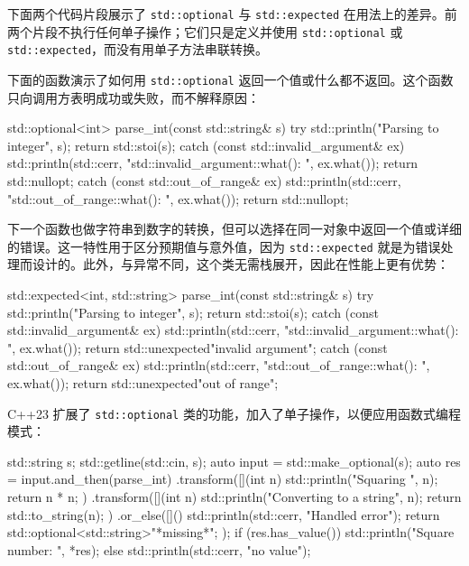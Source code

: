 下面两个代码片段展示了 \texttt{std::\allowbreak{}optional} 与 \texttt{std::\allowbreak{}expected} 在用法上的差异。前两个片段不执行任何单子操作；它们只是定义并使用 \texttt{std::\allowbreak{}optional} 或 \texttt{std::\allowbreak{}expected}，而没有用单子方法串联转换。

\label{idx:475}
下面的函数演示了如何用 \texttt{std::\allowbreak{}optional} 返回一个值或什么都不返回。这个函数只向调用方表明成功或失败，而不解释原因：

\begin{codebox}[cpp]
std::optional<int> parse_int(const std::string& s) {
    try {
        std::println("Parsing {} to integer", s);
        return std::stoi(s);
    } catch (const std::invalid_argument& ex) {
        std::println(std::cerr, "std::invalid_argument::what(): {}", ex.what());
        return std::nullopt;
    } catch (const std::out_of_range& ex) {
        std::println(std::cerr, "std::out_of_range::what(): {}", ex.what());
        return std::nullopt;
    }
}
\end{codebox}

下一个函数也做字符串到数字的转换，但可以选择在同一对象中返回一个值或详细的错误。这一特性用于区分预期值与意外值，因为 \texttt{std::\allowbreak{}expected} 就是为错误处理而设计的。此外，与异常不同，这个类无需栈展开，因此在性能上更有优势：

\begin{codebox}[cpp]
std::expected<int, std::string> parse_int(const std::string& s) {
    try {
        std::println("Parsing {} to integer", s);
        return std::stoi(s);
    } catch (const std::invalid_argument& ex) {
        std::println(std::cerr, "std::invalid_argument::what(): {}", ex.what());
        return std::unexpected{"invalid argument"};
    } catch (const std::out_of_range& ex) {
        std::println(std::cerr, "std::out_of_range::what(): {}", ex.what());
        return std::unexpected{"out of range"};
    }
}
\end{codebox}

C++23 扩展了 \texttt{std::\allowbreak{}optional} 类的功能，加入了单子操作，以便应用函数式编程模式：

\begin{codebox}[cpp]
std::string s;
std::getline(std::cin, s);
auto input = std::make_optional(s);
auto res =
    input.and_then(parse_int)
         .transform([](int n) {
             std::println("Squaring {}", n);
             return n * n;
         })
         .transform([](int n) {
             std::println("Converting {} to a string", n);
             return std::to_string(n);
         })
         .or_else([]() {
             std::println(std::cerr, "Handled error");
             return std::optional<std::string>{"*missing*"};
         });
if (res.has_value()) {
    std::println("Square number: {}", *res);
} else {
    std::println(std::cerr, "no value");
}
\end{codebox}

